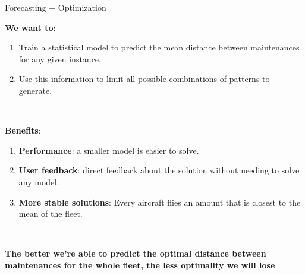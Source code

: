 \documentclass[usenames,dvipsnames]{beamer}
\begin{document}
\begin{frame}

\begin{block}{Forecasting + Optimization}

\textbf{We want to}:

\begin{enumerate}[<+->]

\item
  Train a statistical model to predict the mean distance between
  maintenances for any given instance.
\item
  Use this information to limit all possible combinations of patterns to
  generate.
\end{enumerate}

--

\textbf{Benefits}:

\begin{enumerate}[<+->]

\item
  \textbf{Performance}: a smaller model is easier to solve.
\item
  \textbf{User feedback}: direct feedback about the solution without
  needing to solve any model.
\item
  \textbf{More stable solutions}: Every aircraft flies an amount that is
  closest to the mean of the fleet.
\end{enumerate}

--

\textbf{The better we're able to predict the optimal distance between
maintenances for the whole fleet, the less optimality we will lose}

\end{block}

\end{frame}
\end{document}

